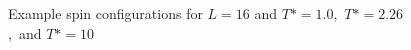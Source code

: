 \documentclass[11pt]{article}
\begin{document}
    \begin{figure}[H]
        \centering
        \caption{Example spin configurations for $L = 16$ and $T* = 1.0$,\ $T* = 2.26$,\ and $T* = 10$ }
        \label{fig:second}
    \end{figure}
\end{document}
